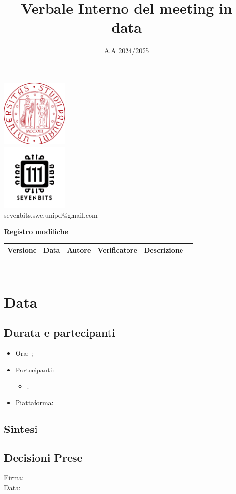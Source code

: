\documentclass[10pt]{article}
\title{Verbale Interno del meeting in data}
\date{A.A 2024/2025}
\begin{document}
\maketitle
\center 
\includegraphics[width=0.25\textwidth]{LogoUnipd}\\
\includegraphics[width=0.25\textwidth]{Sevenbitslogo}\\
sevenbits.swe.unipd@gmail.com\\
\vspace{2mm}

\textbf{Registro modifiche}\\
\vspace{2mm}
\begin{tabular}{|l|l|l|l|l|l|}
\hline
\textbf{Versione} & \textbf{Data} & \textbf{Autore} & \textbf{Verificatore} & \textbf{Descrizione} \\
\hline
\end{tabular}

\raggedright
\tableofcontents
\
\section{Data}
\subsection{Durata e partecipanti}
\begin{itemize}
\item Ora: ;
\item Partecipanti: 	
	\begin{itemize}
	\item .
	\end{itemize}
\item Piattaforma:
\end{itemize}
\subsection{Sintesi}
\subsection{Decisioni Prese}

\vfill
\begin{minipage}{10cm}
Firma: \hrulefill \\
\vspace{2mm}
Data: \dotfill
\end{minipage}
\end{document}
